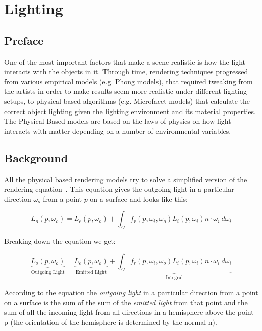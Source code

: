 \section{Lighting}
\subsection{Preface}
One of the most important factors that make a scene realistic is how the light interacts with the objects in it.
Through time, rendering techniques progressed from various empirical models (e.g. Phong models), that required
tweaking from the artists in order to make results seem more realistic under different lighting setups, to physical based
algorithms (e.g. Microfacet models) that calculate the correct object lighting given the lighting environment and
its material properties. The Physical Based models are based on the laws of physics on how light interacts with
matter depending on a number of environmental variables.

\subsection{Background}
All the physical based rendering models try to solve a simplified version of the rendering equation~\cite{lighting:ref32}.
This equation gives the outgoing light in a particular direction $\omega_o$ from a point $p$ on a surface
and looks like this:

\begin{equation}
\label{eq:rendeq}
L_o(p,\omega_o) = L_e(p, \omega_o) + \int_\Omega f_r(p,\omega_i,\omega_o)L_i(p,\omega_i)n\cdot\omega_i \ d\omega_i
\end{equation}

\noindent Breaking down the equation we get:

\begin{equation}
\underbrace{L_o(p,\omega_o)}_\text{Outgoing Light} = \underbrace{L_e(p, \omega_o)}_\text{Emitted Light} + \underbrace{\int_\Omega f_r(p,\omega_i,\omega_o)L_i(p,\omega_i)n\cdot\omega_i \ d\omega_i}_\text{Integral}
\end{equation}

According to the equation the \textit{outgoing light} in a particular direction from a point on a surface is the sum of the
sum of the \textit{emitted light} from that point and the sum of all the incoming light from all directions in a hemisphere
above the point p (the orientation of the hemisphere is determined by the normal n).

